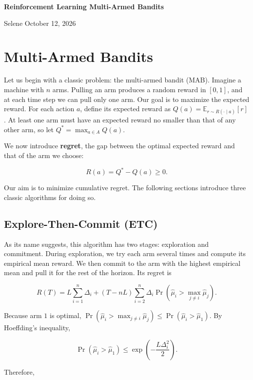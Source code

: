 \documentclass[a4paper,10pt]{article}
\begin{document}
\begin{center}
  {\Large\bfseries Reinforcement Learning \textbar{} Multi-Armed Bandits\par}
  \vspace{0.5em}
  Selene \quad\textperiodcentered\quad October 12, 2026
\end{center}
\vspace{0.7em}

\section{Multi-Armed Bandits}

Let us begin with a classic problem: the multi-armed bandit (MAB). Imagine a machine with \(n\) arms. Pulling an arm produces a random reward in \([0,1]\), and at each time step we can pull only one arm. Our goal is to maximize the expected reward. For each action \(a\), define its expected reward as \(Q(a)=\mathbb{E}_{r\sim R(\cdot\mid a)}[r]\). At least one arm must have an expected reward no smaller than that of any other arm, so let \(Q^*=\max_{a\in A}Q(a)\).

We now introduce \textbf{regret}, the gap between the optimal expected reward and that of the arm we choose:

\[
R(a)=Q^*-Q(a)\ge 0.
\]

Our aim is to minimize cumulative regret. The following sections introduce three classic algorithms for doing so.

\subsection{Explore-Then-Commit (ETC)}

As its name suggests, this algorithm has two stages: exploration and commitment. During exploration, we try each arm several times and compute its empirical mean reward. We then commit to the arm with the highest empirical mean and pull it for the rest of the horizon. Its regret is

\[
R(T)=L\sum_{i=1}^{n}\Delta_i+(T-nL)\sum_{i=2}^{n}\Delta_i\Pr\left(\hat{\mu}_i>\max_{j\ne i}\hat{\mu}_j\right).
\]

Because arm \(1\) is optimal, \(\Pr(\hat{\mu}_i>\max_{j\ne i}\hat{\mu}_j)\le\Pr(\hat{\mu}_i>\hat{\mu}_1)\). By Hoeffding's inequality,

\[
\Pr(\hat{\mu}_i>\hat{\mu}_1)\le\exp\left(-\frac{L\Delta_i^2}{2}\right).
\]

Therefore,
\end{document}
